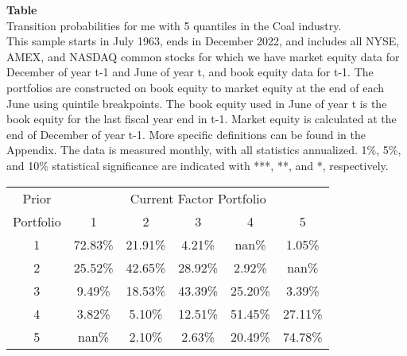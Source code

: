 \begin{table*}[ht!]
\raggedright
{}
\label{tab: transition_probs_me_Coal_with_5_quantiles}
\textbf{Table \thetable} \\
Transition probabilities for me with 5 quantiles in the Coal industry. \\
\hspace*{1em}This sample starts in July 1963, ends in December 2022, and includes all NYSE, AMEX, and NASDAQ common stocks for which we have market equity data for December of year t-1 and June of year t, and book equity data for t-1. The portfolios are constructed on book equity to market equity at the end of each June using quintile breakpoints.  The book equity used in June of year t is the book equity for the last fiscal year end in t-1.  Market equity is calculated at the end of December of year t-1.  More specific definitions can be found in the Appendix.  The data is measured monthly, with all statistics annualized.  1\%, 5\%, and 10\% statistical significance are indicated with ***, **, and *, respectively. \\
\vspace{0.5em}
\centering
\begin{adjustbox}{max width=\textwidth}
\begin{tabular}{@{}cccccc@{}}
\toprule
Prior & \multicolumn{5}{c}{Current Factor Portfolio} \\
Portfolio & 1 & 2 & 3 & 4 & 5 \\
\midrule
1 & 72.83\% & 21.91\% & 4.21\% & nan\% & 1.05\% \\
2 & 25.52\% & 42.65\% & 28.92\% & 2.92\% & nan\% \\
3 & 9.49\% & 18.53\% & 43.39\% & 25.20\% & 3.39\% \\
4 & 3.82\% & 5.10\% & 12.51\% & 51.45\% & 27.11\% \\
5 & nan\% & 2.10\% & 2.63\% & 20.49\% & 74.78\% \\
\bottomrule
\end{tabular}
\end{adjustbox}
\end{table*}